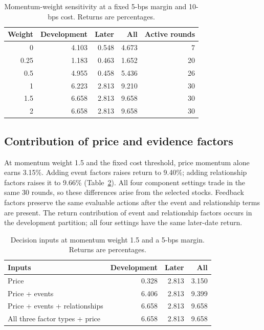 \documentclass[conference]{IEEEtran}
\begin{document}
\begin{table}[!tb]
\centering
\caption{Momentum-weight sensitivity at a fixed 5-bps margin and 10-bps cost. Returns are percentages.}
\label{tab:execution}
\begin{tabular}{rrrrr}
\toprule
Weight & Development & Later & All & Active rounds\\
\midrule
0 & 4.103 & 0.548 & 4.673 & 7\\
0.25 & 1.183 & 0.463 & 1.652 & 20\\
0.5 & 4.955 & 0.458 & 5.436 & 26\\
1 & 6.223 & 2.813 & 9.210 & 30\\
1.5 & 6.658 & 2.813 & 9.658 & 30\\
2 & 6.658 & 2.813 & 9.658 & 30\\
\bottomrule
\end{tabular}
\end{table}

\subsection{Contribution of price and evidence factors}
At momentum weight 1.5 and the fixed cost threshold, price momentum alone earns 3.15\%. Adding event factors raises return to 9.40\%; adding relationship factors raises it to 9.66\% (Table~\ref{tab:components}). All four component settings trade in the same 30 rounds, so these differences arise from the selected stocks. Feedback factors preserve the same evaluable actions after the event and relationship terms are present. The return contribution of event and relationship factors occurs in the development partition; all four settings have the same later-date return.

\begin{table}[!tb]
\centering
\caption{Decision inputs at momentum weight 1.5 and a 5-bps margin. Returns are percentages.}
\label{tab:components}
\begin{tabular}{lrrr}
\toprule
Inputs & Development & Later & All\\
\midrule
Price & 0.328 & 2.813 & 3.150\\
Price + events & 6.406 & 2.813 & 9.399\\
Price + events + relationships & 6.658 & 2.813 & 9.658\\
All three factor types + price & 6.658 & 2.813 & 9.658\\
\bottomrule
\end{tabular}
\end{table}
\end{document}
